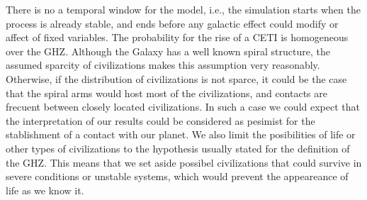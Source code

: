 \documentclass[crop]{CSLB}%
\begin{document}
There is no a temporal window for the model, i.e., the simulation
starts when the process is already stable, and ends before any
galactic effect could modify or affect of fixed variables.
%
The probability for the rise of a CETI is homogeneous over the GHZ.
%
Although the Galaxy has a well known spiral structure, the assumed
sparcity of civilizations makes this assumption very reasonably.
%
Otherwise, if the distribution of civilizations is not sparce, it
could be the case that the spiral arms would host most of the
civilizations, and contacts are frecuent between closely located
civilizations.
%
In such a case we could expect that the interpretation of our results
could be considered as pesimist for the stablishment of a contact with
our planet.
%
We also limit the posibilities of life or other types of civilizations
to the hypothesis usually stated for the definition of the GHZ.
%
This means that we set aside possibel civilizations that could survive
in severe conditions or unstable systems, which would prevent the
appeareance of life as we know it.
\end{document}
